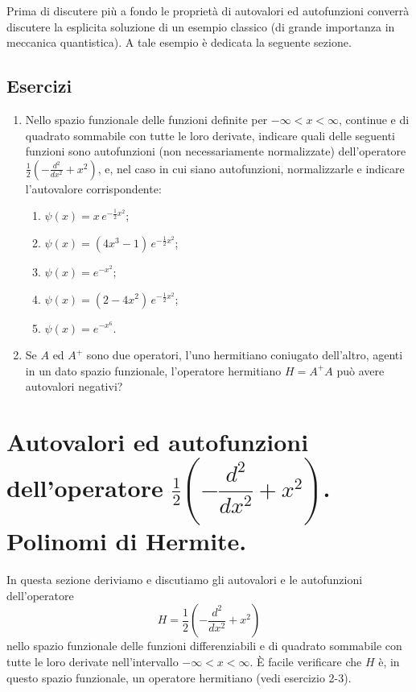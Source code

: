 \documentclass[11pt, a4paper]{book}
\numberwithin{equation}{section}
\newenvironment{esercizi}{\subsection*{Esercizi}\begin{enumerate}}{\end{enumerate}}
\begin{document}
Prima di discutere più a fondo le proprietà di autovalori ed
autofunzioni converrà discutere la esplicita soluzione di un esempio
classico (di grande importanza in meccanica quantistica). A tale esempio
è dedicata la seguente sezione.

\begin{esercizi}

\item Nello spazio funzionale delle funzioni definite per $-\infty < x
< \infty$, continue e di quadrato sommabile con tutte le loro derivate,
indicare quali delle seguenti funzioni sono autofunzioni (non
necessariamente normalizzate) dell'operatore $\frac{1}{2}\left(-\frac{d^2}{dx^2}+x^2\right)$,
e, nel caso in cui siano autofunzioni, normalizzarle e indicare
l'autovalore corrispondente:
\begin{enumerate}
  \item $\psi(x) = x\,e^{-\frac{1}{2}x^2}$;
  \item $\psi(x) = (4x^3-1)\,e^{-\frac{1}{2}x^2}$; %
  \item $\psi(x) = e^{-x^2}$;
  \item $\psi(x) = (2-4x^2)\,e^{-\frac{1}{2}x^2}$;
  \item $\psi(x) = e^{-x^6}$.
\end{enumerate}

\item Se $A$ ed $A^+$ sono due operatori, l'uno hermitiano coniugato
dell'altro, agenti in un dato spazio funzionale, l'operatore hermitiano
$H=A^+A$ può avere autovalori negativi?

\end{esercizi}

\section[autovalori ed autofunzioni di
$\frac{1}{2}\!\left(-\dfrac{d^2}{dx^2}+x^2\right)$. Polinomi di Hermite.]{Autovalori ed autofunzioni dell'operatore
$\frac{1}{2}\!\left(-\dfrac{d^2}{dx^2}+x^2\right)$. Polinomi di Hermite.}

In questa sezione deriviamo e discutiamo gli autovalori e le
autofunzioni dell'operatore
\begin{equation}
H = \frac{1}{2}\left(-\frac{d^2}{dx^2}+x^2\right)
\end{equation}
nello spazio funzionale delle funzioni differenziabili e di quadrato
sommabile con tutte le loro derivate nell'intervallo $-\infty < x <
\infty$. È facile verificare che $H$ è, in questo spazio funzionale, un
operatore hermitiano (vedi esercizio 2-3).
\end{document}
